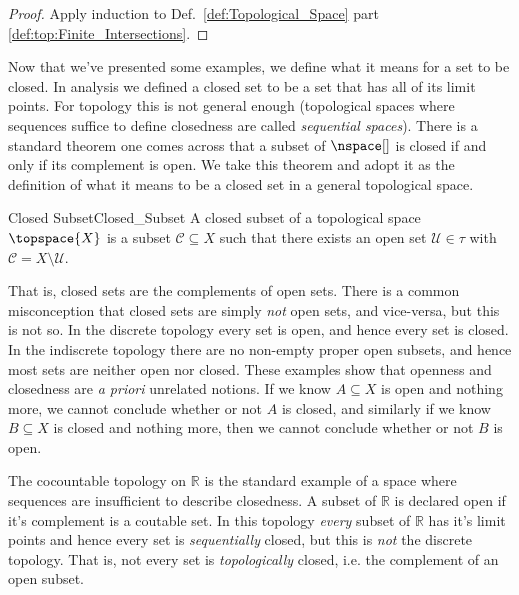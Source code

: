         \begin{proof}
            Apply induction to Def.~\ref{def:Topological_Space}
            part \ref{def:top:Finite_Intersections}.
        \end{proof}
        Now that we've presented some examples, we define what it means
        for a set to be closed. In analysis we
        defined a closed set to be a set that has all of its limit
        points. For topology this is not general enough (topological
        spaces where sequences suffice to define closedness are called
        \textit{sequential spaces}). There is a
        standard theorem one comes across that a subset of $\nspace[]$
        is closed if and only if its complement is open. We take this
        theorem and adopt it as the definition of what it means to be a
        closed set in a general topological space.
        \begin{fdefinition}{Closed Subset}{Closed_Subset}
            A closed subset of a topological space $\topspace{X}$ is a
            subset $\mathcal{C}\subseteq{X}$ such that there exists an
            open set $\mathcal{U}\in\tau$ with
            $\mathcal{C}=X\setminus\mathcal{U}$.%
        \end{fdefinition}
        That is, closed sets are the complements of open sets. There is
        a common misconception that closed sets are simply \textit{not}
        open sets, and vice-versa, but this is not so. In the discrete
        topology every set is open, and hence every set is closed. In
        the indiscrete topology there are no non-empty proper open
        subsets, and hence most sets are neither open nor closed. These
        examples show that openness and closedness are
        \textit{a priori} unrelated notions. If we know $A\subseteq{X}$
        is open and nothing more, we cannot conclude whether or not $A$
        is closed, and similarly if we know $B\subseteq{X}$ is closed
        and nothing more, then we cannot conclude whether or not $B$ is
        open.
        \begin{example}
            The cocountable topology on $\mathbb{R}$ is the standard
            example of a space where sequences are insufficient to
            describe closedness. A subset of $\mathbb{R}$ is declared
            open if it's complement is a coutable set. In this topology
            \textit{every} subset of $\mathbb{R}$ has it's limit points
            and hence every set is \textit{sequentially} closed, but
            this is \textit{not} the discrete topology. That is, not
            every set is \textit{topologically} closed, i.e. the
            complement of an open subset.
        \end{example}
